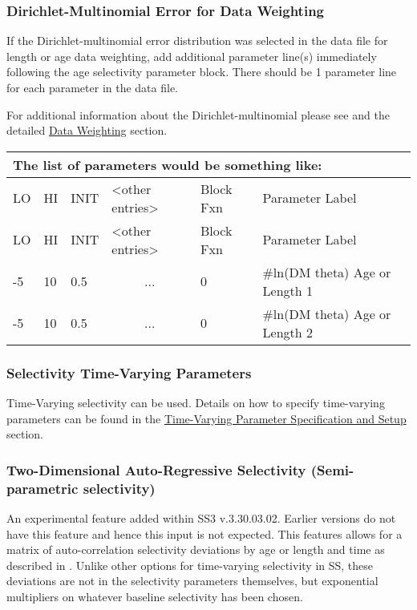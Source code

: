 \hypertarget{Dirichletparameter}{}
\subsubsection{Dirichlet-Multinomial Error for Data Weighting}
If the Dirichlet-multinomial error distribution was selected in the data file for length or age data weighting, add additional parameter line(s) immediately following the age selectivity parameter block. There should be 1 parameter line for each parameter in the data file.

For additional information about the Dirichlet-multinomial please see \citet{thorson-model-based-2017} and the detailed \hyperlink{DataWeight}{Data Weighting} section.

	
\begin{longtable}{p{1cm} p{1cm} p{1cm} p{2.9cm}  p{1.8cm}  p{6.5cm}}
	\multicolumn{6}{l}{The list of parameters would be something like:}\\
	\hline
	LO \Tstrut & HI & INIT  &  <other entries> & Block Fxn & Parameter Label\Bstrut\\
	\hline
	\endfirsthead
	
	\hline
	LO \Tstrut & HI & INIT & <other entries> & Block Fxn & Parameter Label\Bstrut\\
	\hline
	\endhead

	-5   & 10 & 0.5  & \multicolumn{1}{c}{...}  & 0   & \#ln(DM theta) Age or Length 1 \Tstrut\\
	-5   & 10 & 0.5  & \multicolumn{1}{c}{...}  & 0   & \#ln(DM theta) Age or Length 2\Bstrut\\
	\hline
\end{longtable}


\subsubsection{Selectivity Time-Varying Parameters}
Time-Varying selectivity can be used. Details on how to specify time-varying parameters can be found in the \hyperlink{tvOrder}{Time-Varying Parameter Specification and Setup} section.

\subsubsection{Two-Dimensional Auto-Regressive Selectivity (Semi-parametric selectivity)}
An experimental feature added within SS3 v.3.30.03.02. Earlier versions do not have this feature and hence this input is not expected.  This features allows for a matrix of auto-correlation selectivity deviations by age or length and time as described in \citet{xu-new-2019}. Unlike other options for time-varying selectivity in SS, these deviations are not in the selectivity parameters themselves, but exponential multipliers on whatever baseline selectivity has been chosen.  

